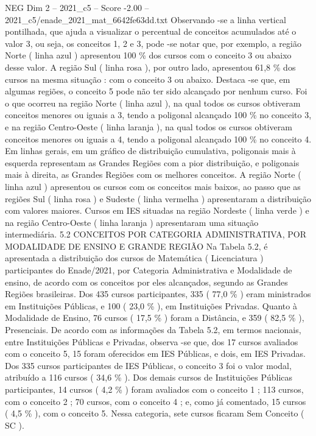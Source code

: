 \begin{textsample}{NEG Dim 2 – 2021\_c5 – Score -2.00 – 2021\_c5/enade\_2021\_mat\_6642fe63dd.txt}
Observando -se a linha vertical pontilhada, que ajuda a visualizar o percentual de conceitos acumulados até o valor 3, ou seja, os conceitos 1, 2 e 3, pode -se notar que, por exemplo, a região Norte ( linha azul ) apresentou 100 \% dos cursos com o conceito 3 ou abaixo desse valor.
A região Sul ( linha rosa ), por outro lado, apresentou 61,8 \% dos cursos na mesma situação : com o conceito 3 ou abaixo.
Destaca -se que, em algumas regiões, o conceito 5 pode não ter sido alcançado por nenhum curso.
Foi o que ocorreu na região Norte ( linha azul ), na qual todos os cursos obtiveram conceitos menores ou iguais a 3, tendo a poligonal alcançado 100 \% no conceito 3, e na região Centro-Oeste ( linha laranja ), na qual todos os cursos obtiveram conceitos menores ou iguais a 4, tendo a poligonal alcançado 100 \% no conceito 4.
Em linhas gerais, em um gráfico de distribuição cumulativa, poligonais mais à esquerda representam as Grandes Regiões com a pior distribuição, e poligonais mais à direita, as Grandes Regiões com os melhores conceitos.
A região Norte ( linha azul ) apresentou os cursos com os conceitos mais baixos, ao passo que as regiões Sul ( linha rosa ) e Sudeste ( linha vermelha ) apresentaram a distribuição com valores maiores.
Cursos em IES situadas na região Nordeste ( linha verde ) e na região Centro-Oeste ( linha laranja ) apresentaram uma situação intermediária. 5.2 CONCEITOS POR CATEGORIA ADMINISTRATIVA, POR MODALIDADE DE ENSINO E GRANDE REGIÃO Na Tabela 5.2, é apresentada a distribuição dos cursos de Matemática ( Licenciatura ) participantes do Enade/2021, por Categoria Administrativa e Modalidade de ensino, de acordo com os conceitos por eles alcançados, segundo as Grandes Regiões brasileiras.
Dos 435 cursos participantes, 335 ( 77,0 \% ) eram ministrados em Instituições Públicas, e 100 ( 23,0 \% ), em Instituições Privadas.
Quanto à Modalidade de Ensino, 76 cursos ( 17,5 \% ) foram a Distância, e 359 ( 82,5 \% ), Presenciais.
De acordo com as informações da Tabela 5.2, em termos nacionais, entre Instituições Públicas e Privadas, observa -se que, dos 17 cursos avaliados com o conceito 5, 15 foram oferecidos em IES Públicas, e dois, em IES Privadas.
Dos 335 cursos participantes de IES Públicas, o conceito 3 foi o valor modal, atribuído a 116 cursos ( 34,6 \% ).
Dos demais cursos de Instituições Públicas participantes, 14 cursos ( 4,2 \% ) foram avaliados com o conceito 1 ; 113 cursos, com o conceito 2 ; 70 cursos, com o conceito 4 ; e, como já comentado, 15 cursos ( 4,5 \% ), com o conceito 5.
Nessa categoria, sete cursos ficaram Sem Conceito ( SC ).

\end{textsample}
